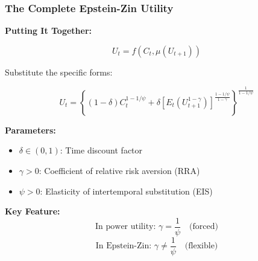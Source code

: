 \documentclass{beamer}
\begin{document}
\begin{frame}
    \frametitle{The Complete Epstein-Zin Utility}
    
    \textbf{Putting It Together:}
    
    \begin{equation*}
        U_t = f(C_t, \mu(U_{t+1}))
    \end{equation*}
    
    Substitute the specific forms:
    
    \begin{tcolorbox}[colback=green!5!white, colframe=green!75!black, title=Epstein-Zin Utility Function]
    \begin{equation*}
        U_t = \left\{ (1-\delta)C_t^{1-1/\psi} + \delta \left[ E_t(U_{t+1}^{1-\gamma}) \right]^{\frac{1-1/\psi}{1-\gamma}} \right\}^{\frac{1}{1-1/\psi}}
    \end{equation*}
    \end{tcolorbox}
    
    
    \textbf{Parameters:}
    \begin{itemize}
        \item $\delta \in (0,1)$: Time discount factor
        \item $\gamma > 0$: Coefficient of relative risk aversion (RRA)
        \item $\psi > 0$: Elasticity of intertemporal substitution (EIS)
    \end{itemize}
    
    
    \textbf{Key Feature:}
    \begin{equation*}
        \text{In power utility: } \gamma = \frac{1}{\psi} \quad \text{(forced)}
    \end{equation*}
    \begin{equation*}
        \text{In Epstein-Zin: } \gamma \neq \frac{1}{\psi} \quad \text{(flexible)}
    \end{equation*}
    
\end{frame}
\end{document}
